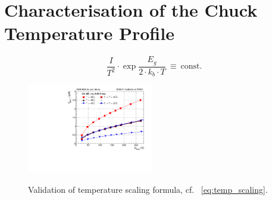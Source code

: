 \section{Characterisation of the Chuck Temperature Profile}
\label{appendix:chuck_temp}

\begin{equation}
    \label{eq:temp_scaling}
    \frac{I}{T^2}\cdot \exp{\frac{E_g}{2\cdot k_b \cdot T}}~\equiv~\text{const.}
\end{equation}

\begin{figure}[h]
	\centering
	\includegraphics[width=0.49\textwidth]{plots/iv_temp_scaling/iv_overlay_ch24.pdf}
	\label{plot:iv_tempscaling}
	\caption{
	    Validation of temperature scaling formula, cf. ~\ref{eq:temp_scaling}.
	}
\end{figure}